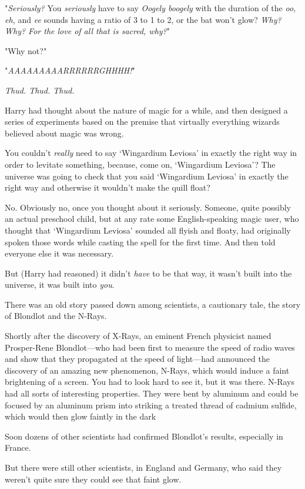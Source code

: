 "\emph{Seriously?} You \emph{seriously} have to say \emph{Oogely boogely} with
the duration of the \emph{oo, eh,} and \emph{ee} sounds having a ratio of 3 to
1 to 2, or the bat won't glow? \emph{Why? Why? For the love of all that is
sacred, why?}"

"Why not?"

"\emph{AAAAAAAAARRRRRRGHHHH!}"

\emph{Thud. Thud. Thud.}

Harry had thought about the nature of magic for a while, and then designed a
series of experiments based on the premise that virtually everything wizards
believed about magic was wrong.

You couldn't \emph{really} need to say `Wingardium Leviosa' in exactly the
right way in order to levitate something, because, come on, `Wingardium
Leviosa'? The universe was going to check that you said `Wingardium Leviosa' in
exactly the right way and otherwise it wouldn't make the quill float?

No. Obviously no, once you thought about it seriously. Someone, quite possibly
an actual preschool child, but at any rate some English-speaking magic user,
who thought that `Wingardium Leviosa' sounded all flyish and floaty, had
originally spoken those words while casting the spell for the first time. And
then told everyone else it was necessary.

But (Harry had reasoned) it didn't \emph{have} to be that way, it wasn't built
into the universe, it was built into \emph{you}.

There was an old story passed down among scientists, a cautionary tale, the
story of Blondlot and the N-Rays.

Shortly after the discovery of X-Rays, an eminent French physicist named
Prosper-Rene Blondlot---who had been first to measure the speed of radio waves
and show that they propagated at the speed of light---had announced the
discovery of an amazing new phenomenon, N-Rays, which would induce a faint
brightening of a screen. You had to look hard to see it, but it was there.
N-Rays had all sorts of interesting properties. They were bent by aluminum and
could be focused by an aluminum prism into striking a treated thread of
cadmium sulfide, which would then glow faintly in the dark{\el}

Soon dozens of other scientists had confirmed Blondlot's results, especially in
France.

But there were still other scientists, in England and Germany, who said they
weren't quite sure they could see that faint glow.

